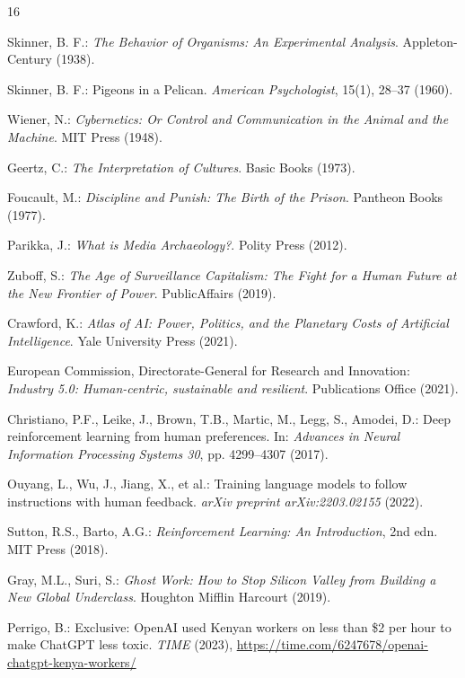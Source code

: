 \documentclass[11pt, a4paper]{article}
\begin{document}
\begin{thebibliography}{16}

Skinner, B. F.: \textit{The Behavior of Organisms: An Experimental Analysis}. Appleton-Century (1938).

Skinner, B. F.: Pigeons in a Pelican. \textit{American Psychologist}, 15(1), 28--37 (1960).

Wiener, N.: \textit{Cybernetics: Or Control and Communication in the Animal and the Machine}. MIT Press (1948).

Geertz, C.: \textit{The Interpretation of Cultures}. Basic Books (1973).

Foucault, M.: \textit{Discipline and Punish: The Birth of the Prison}. Pantheon Books (1977).

Parikka, J.: \textit{What is Media Archaeology?}. Polity Press (2012).

Zuboff, S.: \textit{The Age of Surveillance Capitalism: The Fight for a Human Future at the New Frontier of Power}. PublicAffairs (2019).

Crawford, K.: \textit{Atlas of AI: Power, Politics, and the Planetary Costs of Artificial Intelligence}. Yale University Press (2021).

European Commission, Directorate-General for Research and Innovation: \textit{Industry 5.0: Human-centric, sustainable and resilient}. Publications Office (2021).

Christiano, P.F., Leike, J., Brown, T.B., Martic, M., Legg, S., Amodei, D.: Deep reinforcement learning from human preferences. In: \textit{Advances in Neural Information Processing Systems 30}, pp. 4299--4307 (2017).

Ouyang, L., Wu, J., Jiang, X., et al.: Training language models to follow instructions with human feedback. \textit{arXiv preprint arXiv:2203.02155} (2022).

Sutton, R.S., Barto, A.G.: \textit{Reinforcement Learning: An Introduction}, 2nd edn. MIT Press (2018).

Gray, M.L., Suri, S.: \textit{Ghost Work: How to Stop Silicon Valley from Building a New Global Underclass}. Houghton Mifflin Harcourt (2019).

Perrigo, B.: Exclusive: OpenAI used Kenyan workers on less than \$2 per hour to make ChatGPT less toxic. \textit{TIME} (2023), \url{https://time.com/6247678/openai-chatgpt-kenya-workers/}


\end{thebibliography}
\end{document}
